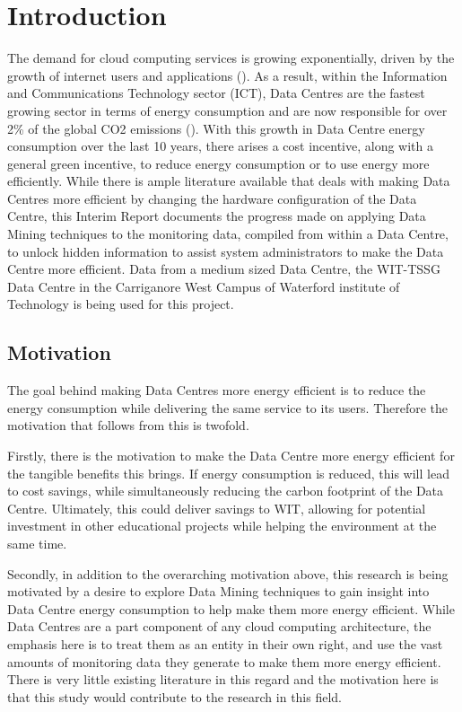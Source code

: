 \documentclass[12pt]{scrartcl}
\begin{document}
\section{Introduction}
\label{sec:[introduction]}
The demand for cloud computing services is growing exponentially, driven by the growth of internet users and applications (\cite{edssch.qt9c84f49g20130101}). As a result, within the Information and Communications Technology sector (ICT), Data Centres are the fastest growing sector in terms of energy consumption and are now responsible for over 2\% of the global CO2 emissions (\cite{edsbas.13818AC20170101}). With this growth in Data Centre energy consumption over the last 10 years, there arises a cost incentive, along with a general green incentive, to reduce energy consumption or to use energy more efficiently. While there is ample literature available that deals with making Data Centres more efficient by changing the hardware configuration of the Data Centre, this Interim Report documents the progress made on applying Data Mining techniques to the monitoring data, compiled from within a Data Centre, to unlock hidden information to assist system administrators to make the Data Centre more efficient. Data from a medium sized Data Centre, the WIT-TSSG Data Centre in the Carriganore West Campus of Waterford institute of Technology is being used for this project.  


\subsection{Motivation}
\label{subsec:[Motivation]}
The goal behind making Data Centres more energy efficient is to reduce the energy consumption while delivering the same service to its users. Therefore the motivation that follows from this is twofold. 

Firstly, there is the motivation to make the Data Centre more energy efficient for the tangible benefits this brings. If energy consumption is reduced, this will lead to cost savings, while simultaneously reducing the carbon footprint of the Data Centre. Ultimately, this could deliver savings to WIT, allowing for potential investment in other educational projects while helping the environment at the same time. 

Secondly, in addition to the overarching motivation above, this research is being motivated by a desire to explore Data Mining techniques to gain insight into Data Centre energy consumption to help make them more energy efficient. While Data Centres are a part component of any cloud computing architecture, the emphasis here is to treat them as an entity in their own right, and use the vast amounts of monitoring data they generate to make them more energy efficient. There is very little existing literature in this regard and the motivation here is that this study would contribute to the research in this field.  
\end{document}
